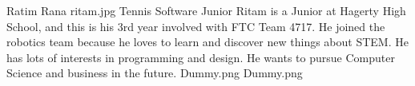 \insertbio
{Ratim Rana}
{ritam.jpg}
{Tennis}
{Software}
{Junior}
{
Ritam is a Junior at Hagerty High School, and this is his 3rd year involved with FTC Team 4717. He joined the robotics team because he loves to learn and discover new things about STEM. He has lots of interests in programming and design. He wants to pursue Computer Science and business in the future.
}
{Dummy.png}
{Dummy.png}

